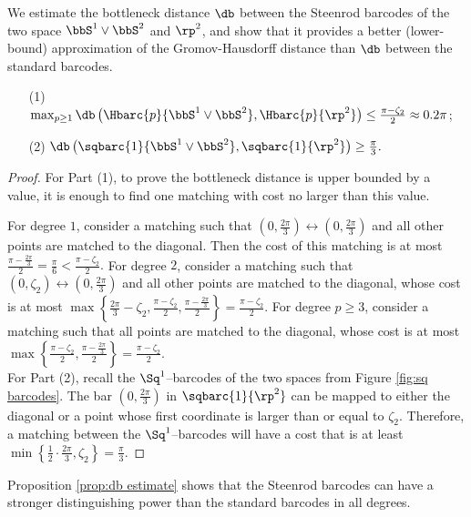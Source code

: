 We estimate the bottleneck distance $\db$ between the Steenrod barcodes of the two space $\bbS^1\vee\bbS^2$ and $\rp^2$, and show that it provides a better (lower-bound) approximation of the Gromov-Hausdorff distance than $\db$ between the standard barcodes.  

\begin{proposition}\label{prop:db estimate}
\begin{itemize}
    \item [(1)] $\max_{p\geq 1}\db\left(\Hbarc{p}{\bbS^1\vee\bbS^2}, \Hbarc{p}{\rp^2}\right)\leq \frac{\pi-\zeta_2}{2}\approx 0.2\pi$;
    \item [(2)] $\db\left(\sqbarc{1}{\bbS^1\vee \bbS^2}, \sqbarc{1}{\rp^2}\right)\geq \frac{\pi}{3}.$
\end{itemize}
\end{proposition}

\begin{proof}
For Part (1), to prove the bottleneck distance is upper bounded by a value, it is enough to find one matching with cost no larger than this value. 

For degree $1$, consider a matching such that $(0,\frac{2\pi}{3})\leftrightarrow (0,\frac{2\pi}{3})$ and all other points are matched to the diagonal. Then the cost of this matching is at most $\frac{\pi-\frac{2\pi}{3}}{2}=\frac{\pi}{6}< \frac{\pi-\zeta_2}{2}.$ 
For degree $2$, consider a matching such that $(0,\zeta_2)\leftrightarrow (0,\frac{2\pi}{3})$ and all other points are matched to the diagonal, whose cost is at most $\max\left\{ \frac{2\pi}{3}-\zeta_2, \frac{\pi-\zeta_2}{2}, \frac{\pi-\frac{2\pi}{3}}{2}\right\} = \frac{\pi-\zeta_2}{2}.$ 
For degree $p\geq 3$, consider a matching such that all points are matched to the diagonal, whose cost is at most $\max\left\{ \frac{\pi-\zeta_2}{2}, \frac{\pi-\frac{2\pi}{3}}{2}\right\} = \frac{\pi-\zeta_2}{2}.$ 
\\

For Part (2), recall the $\Sq^1$--barcodes of the two spaces from Figure \ref{fig:sq barcodes}. The bar $(0,\frac{2\pi}{3})$ in $\sqbarc{1}{\rp^2}$ can be mapped to either the diagonal or a point whose first coordinate is larger than or equal to $\zeta_2$. Therefore, a matching between the $\Sq^1$--barcodes will have a cost that is at least $\min\left\{\frac{1}{2}\cdot\frac{2\pi}{3}, \zeta_2\right\} = \frac{\pi}{3}.$
\end{proof}

Proposition \ref{prop:db estimate} shows that the Steenrod barcodes can have a stronger distinguishing power than the standard barcodes in all degrees.
